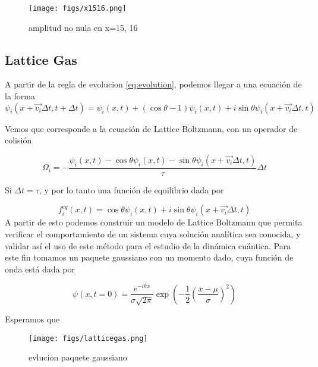 \documentclass[12pts, letterpaper, twocolumn]{article}
\begin{document}
\begin{figure*}[h]
    \centering
    \texttt{[image: figs/x1516.png]}
    \caption{amplitud no nula en x=15, 16}
    \label{fig:x15}
\end{figure*}


\subsection{Lattice Gas}

A partir de la regla de evolucion \ref{eq:evolution}, podemos llegar a una ecuación de la 
forma 
\begin{equation}\label{eq:QLG}
    \psi_i(x+\vec{v_i}\Delta t, t +\Delta t) = \psi_i(x,t) + (\cos\theta -1)\psi_i(x,t)
    + i\sin\theta\psi_i(x+\vec{v_i}\Delta t,t)
\end{equation}

Vemos que corresponde a la ecuación de Lattice Boltzmann, con un operador de colisión 

\begin{equation*}
    \Omega_i = -\frac{\psi_i(x,t)-\cos\theta\psi_i(x,t)
    -\sin\theta\psi_i(x+\vec{v_i}\Delta t,t)}{\tau}\Delta t
\end{equation*}

Si $\Delta t = \tau$, y por lo tanto una función de equilibrio dada por

\begin{equation*}
    f_i^{eq}(x,t)=\cos\theta\psi_i(x,t)+i\sin\theta\psi_i(x+\vec{v_i}\Delta t,t)
\end{equation*}
A partir de esto podemos construir un modelo de Lattice Boltzmann que permita verificar el
comportamiento de un sistema cuya solución analítica sea conocida, y validar así el uso de 
este método para el estudio de la dinámica cuántica. Para este fin tomamos un paquete 
gaussiano con un momento dado, cuya función de onda está dada por

\begin{equation*}
    \psi(x,t=0)=\frac{e^{-ikx}}{\sigma\sqrt{2\pi}}\exp{\left(-\frac{1}{2}\left(
        \frac{x-\mu}{\sigma}\right)^2\right)}
\end{equation*}

Esperamos que 

\begin{figure*}[h]
    \centering
    \texttt{[image: figs/latticegas.png]}
    \caption{evlucion paquete gaussiano}
    \label{fig:gauss}
\end{figure*}
\end{document}
